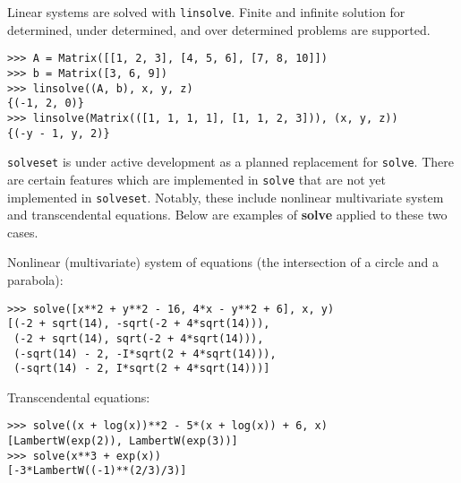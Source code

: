 Linear systems are solved with \texttt{linsolve}. Finite and infinite solution for
determined, under determined, and over determined problems are supported.
\begin{verbatim}
>>> A = Matrix([[1, 2, 3], [4, 5, 6], [7, 8, 10]])
>>> b = Matrix([3, 6, 9])
>>> linsolve((A, b), x, y, z)
{(-1, 2, 0)}
>>> linsolve(Matrix(([1, 1, 1, 1], [1, 1, 2, 3])), (x, y, z))
{(-y - 1, y, 2)}
\end{verbatim}

\texttt{solveset} is under active development as a planned replacement for
\texttt{solve}. There are certain features which are implemented in
\texttt{solve} that are not yet implemented in \texttt{solveset}. Notably,
these include nonlinear multivariate system and transcendental equations.
Below are examples of \textbf{solve} applied to these two cases.

\noindent Nonlinear (multivariate) system of equations (the intersection of a circle
and a parabola):
\begin{verbatim}
>>> solve([x**2 + y**2 - 16, 4*x - y**2 + 6], x, y)
[(-2 + sqrt(14), -sqrt(-2 + 4*sqrt(14))),
 (-2 + sqrt(14), sqrt(-2 + 4*sqrt(14))),
 (-sqrt(14) - 2, -I*sqrt(2 + 4*sqrt(14))),
 (-sqrt(14) - 2, I*sqrt(2 + 4*sqrt(14)))]
\end{verbatim}

\noindent Transcendental equations:
\begin{verbatim}
>>> solve((x + log(x))**2 - 5*(x + log(x)) + 6, x)
[LambertW(exp(2)), LambertW(exp(3))]
>>> solve(x**3 + exp(x))
[-3*LambertW((-1)**(2/3)/3)]
\end{verbatim}
